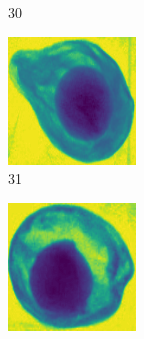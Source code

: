 \documentclass[11pt]{article}
\begin{document}
\begin{figure}[!h]
\begin{subfigure}[b]{0.22\textwidth}
         \caption{30}
         \label{fig:avo_29}
     \end{subfigure}
     \hfill
     \begin{subfigure}[b]{0.22\textwidth}
         \centering
         \includegraphics[width=\textwidth]{figurer/avocado_dataset/avo_30.jpg}
         \caption{31}
         \label{fig:avo_30}
     \end{subfigure}
     \hfill
     \begin{subfigure}[b]{0.22\textwidth}
         \centering
         \includegraphics[width=\textwidth]{figurer/avocado_dataset/avo_31.jpg}

\end{subfigure}
\end{figure}
\end{document}
